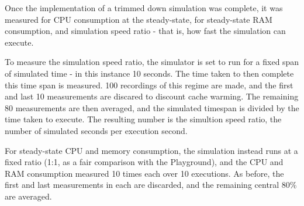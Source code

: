Once the implementation of a trimmed down simulation was complete, it was
measured for CPU consumption at the steady-state, for steady-state RAM
consumption, and simulation speed ratio - that is, how fast the simulation can
execute.

To measure the simulation speed ratio, the simulator is set to run for a fixed
span of simulated time - in this instance 10 seconds. The time taken to then
complete this time span is measured. 100 recordings of this regime are made,
and the first and last 10 measurements are discared to discount cache warming.
The remaining 80 measurements are then averaged, and the simulated timespan is
divided by the time taken to execute. The resulting number is the simultion
speed ratio, the number of simulated seconds per execution second.

For steady-state CPU and memory consumption, the simulation instead runs at a
fixed ratio (1:1, as a fair comparison with the Playground), and the CPU and
RAM consumption measured 10 times each over 10 executions. As before, the first
and last measurements in each are discarded, and the remaining central 80\%
are averaged.
